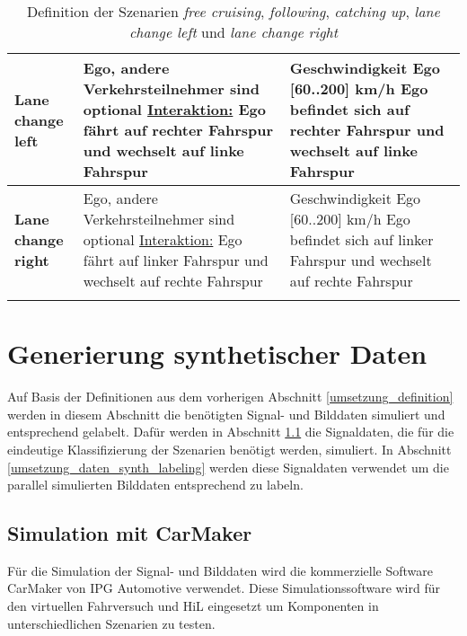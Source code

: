 \begin{longtable}[c]{p{1.5cm} p{6cm} p{6cm}}
\textbf{Lane change left} & Ego, andere Verkehrsteilnehmer sind optional \newline \underline{Interaktion:} Ego fährt auf rechter Fahrspur und wechselt auf linke Fahrspur & Geschwindigkeit Ego [60..200] km/h \newline Ego befindet sich auf rechter Fahrspur und wechselt auf linke Fahrspur \\
\hline

\textbf{Lane change right} & Ego, andere Verkehrsteilnehmer sind optional \newline \underline{Interaktion:} Ego fährt auf linker Fahrspur und wechselt auf rechte Fahrspur & Geschwindigkeit Ego [60..200] km/h \newline Ego befindet sich auf linker Fahrspur und wechselt auf rechte Fahrspur \\
\hline

\caption{Definition der Szenarien \textit{free cruising}, \textit{following}, \textit{catching up}, \textit{lane change left} und \textit{lane change right}}
\label{tab_definition_szenarios}
\end{longtable}
\normalsize

\section{Generierung synthetischer Daten}
\label{umsetzung_daten_synth}

Auf Basis der Definitionen aus dem vorherigen Abschnitt \ref{umsetzung_definition} werden in diesem Abschnitt die benötigten Signal- und Bilddaten simuliert und entsprechend gelabelt. Dafür werden in Abschnitt \ref{umsetzung_daten_synth_simulation} die Signaldaten, die für die eindeutige Klassifizierung der Szenarien benötigt werden, simuliert. In Abschnitt \ref{umsetzung_daten_synth_labeling} werden diese Signaldaten verwendet um die parallel simulierten Bilddaten entsprechend zu labeln.
 
\subsection{Simulation mit CarMaker}
\label{umsetzung_daten_synth_simulation}

Für die Simulation der Signal- und Bilddaten wird die kommerzielle Software CarMaker von IPG Automotive \cite{ipg2018carmaker} verwendet. Diese Simulationssoftware wird für den virtuellen Fahrversuch und \ac{HiL} eingesetzt um Komponenten in unterschiedlichen Szenarien zu testen.

